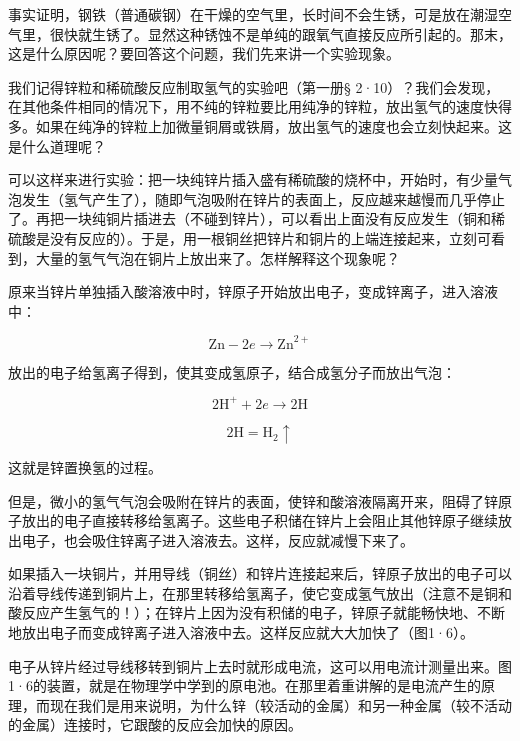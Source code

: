 事实证明，钢铁（普通碳钢）在干燥的空气里，长时间不会生锈，可是放在潮湿空气里，很快就生锈了。显然这种锈蚀不是单纯的跟氧气直接反应所引起的。那末，这是什么原因呢？要回答这个问题，我们先来讲一个实验现象。

我们记得锌粒和稀硫酸反应制取氢气的实验吧（第一册§
2·10）？我们会发现，在其他条件相同的情况下，用不纯的锌粒要比用纯净的锌粒，放出氢气的速度快得多。如果在纯净的锌粒上加微量铜屑或铁屑，放出氢气的速度也会立刻快起来。这是什么道理呢？

可以这样来进行实验：把一块纯锌片插入盛有稀硫酸的烧杯中，开始时，有少量气泡发生（氢气产生了），随即气泡吸附在锌片的表面上，反应越来越慢而几乎停止了。再把一块纯铜片插进去（不碰到锌片），可以看出上面没有反应发生（铜和稀硫酸是没有反应的）。于是，用一根铜丝把锌片和铜片的上端连接起来，立刻可看到，大量的氢气气泡在铜片上放出来了。怎样解释这个现象呢？

原来当锌片单独插入酸溶液中时，锌原子开始放出电子，变成锌离子，进入溶液中：

\[
\mathrm{Zn} - 2 e \longrightarrow \mathrm{Zn} ^{2+}
\]

放出的电子给氢离子得到，使其变成氢原子，结合成氢分子而放出气泡：

\[
2 \mathrm{H} ^ {+} + 2 e \longrightarrow 2 \mathrm{H}
\]

\[
2 \mathrm{H} = \mathrm{H} _ {2} \uparrow
\]

这就是锌置换氢的过程。

但是，微小的氢气气泡会吸附在锌片的表面，使锌和酸溶液隔离开来，阻碍了锌原子放出的电子直接转移给氢离子。这些电子积储在锌片上会阻止其他锌原子继续放出电子，也会吸住锌离子进入溶液去。这样，反应就减慢下来了。

如果插入一块铜片，并用导线（铜丝）和锌片连接起来后，锌原子放出的电子可以沿着导线传递到铜片上，在那里转移给氢离子，使它变成氢气放出（注意不是铜和酸反应产生氢气的！）；在锌片上因为没有积储的电子，锌原子就能畅快地、不断地放出电子而变成锌离子进入溶液中去。这样反应就大大加快了（图1·6）。

电子从锌片经过导线移转到铜片上去时就形成电流，这可以用电流计测量出来。图1·6的装置，就是在物理学中学到的原电池。在那里着重讲解的是电流产生的原理，而现在我们是用来说明，为什么锌（较活动的金属）和另一种金属（较不活动的金属）连接时，它跟酸的反应会加快的原因。


